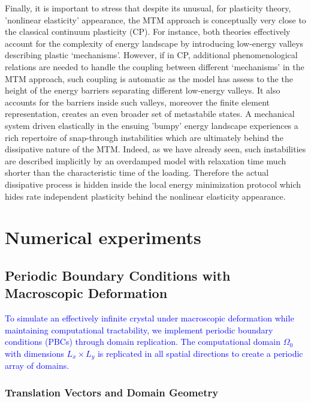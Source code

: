 \documentclass[aps,
superscriptaddress,notitlepage]{revtex4-1}
\begin{document}
 

 
Finally, it is important to stress that  despite its unusual, for plasticity theory, 'nonlinear elasticity' appearance, the MTM approach is  conceptually very close to the classical continuum plasticity (CP). For instance, both theories effectively account for the complexity of energy landscape by introducing low-energy valleys describing plastic `mechanisms'. However, if in CP, additional phenomenological  relations are needed to handle the coupling between different `mechanisms' \cite{Franciosi1985-cu,Cuitino2021-ps,Roters2010-rm,Dawson2000-ca,Bertin2023}
in the MTM approach, such coupling is automatic  as the model has  assess to the the height   of the energy barriers separating different low-energy valleys. It  also accounts for the barriers inside such valleys, moreover the   finite element representation, creates an even  broader set  of metastabile states.   A mechanical system driven elastically in the ensuing 'bumpy' energy  landscape   experiences a rich repertoire of snap-through instabilities which are ultimately behind the dissipative nature of the MTM.  Indeed, as we have already seen, such  instabilities are described implicitly by an overdamped model with relaxation time much shorter than the characteristic time of the loading. Therefore  the actual dissipative process is hidden inside the  local energy minimization protocol which hides   rate independent   plasticity behind the nonlinear elasticity appearance.




 \section{Numerical experiments}

\subsection{Periodic Boundary Conditions with Macroscopic Deformation}

\textcolor{blue}{To simulate an effectively infinite crystal under macroscopic deformation while maintaining computational tractability, we implement periodic boundary conditions (PBCs) through domain replication. The computational domain $\Omega_0$ with dimensions $L_x \times L_y$ is replicated in all spatial directions to create a periodic array of domains.}

\subsubsection{Translation Vectors and Domain Geometry}
\end{document}

